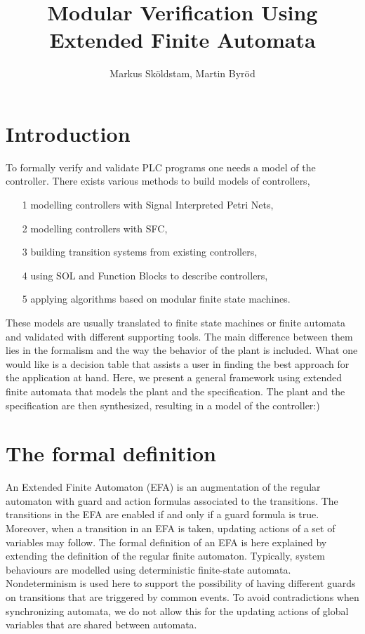 \documentclass{article}
\begin{document}
\title{Modular Verification Using Extended Finite Automata}
\author{Markus Sk\"oldstam, Martin Byr\"od}
\maketitle
\tableofcontents
\section{Introduction}
To formally verify and validate PLC programs one needs a model of the controller.
There exists various methods to build models of
controllers,
\begin{enumerate}
   \item [1] modelling controllers with Signal Interpreted Petri Nets,
   \item [2] modelling controllers with SFC,
   \item [3] building transition systems from existing controllers,
   \item [4] using SOL and Function Blocks to describe controllers,
   \item [5] applying algorithms based on modular finite state machines.

   \end{enumerate}
 These models are usually translated to finite state machines
 or finite automata and validated with different supporting tools. The main difference
 between them lies in the formalism and the way the behavior of the plant is included.
 What one would like is a decision table that assists a user in finding
 the best approach for the application at hand. Here, we present a general framework using
 extended finite automata that models the plant and the specification.
 The plant and the specification are then synthesized, resulting in a model of the controller:)



\section{The formal definition}
An Extended Finite Automaton (EFA) is an
augmentation of the regular automaton with guard and action
formulas associated to the transitions. The transitions in the EFA
are enabled if and only if a guard formula is true. Moreover, when
a transition in an EFA is taken, updating actions of a set of
variables may follow. The formal definition of an EFA is here
explained by extending the definition of the regular finite automaton.
Typically, system behaviours are modelled using deterministic finite-state automata.
Nondeterminism is used here to support the possibility of having different guards on transitions
that are triggered by common events. To avoid contradictions when synchronizing
automata, we do not allow this for the updating actions of global variables
that are shared between automata.\\
\end{document}

